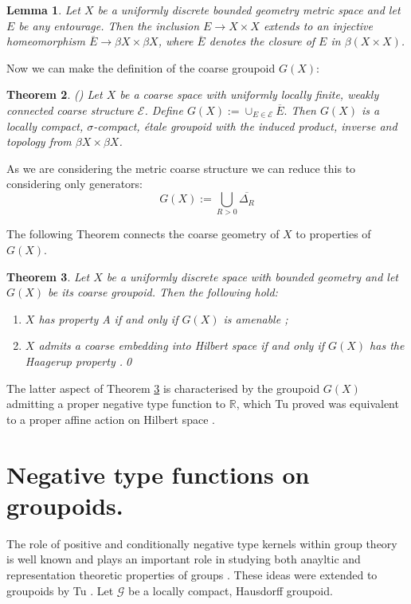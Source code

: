 \documentclass[11pt]{amsart}
\theoremstyle{plain}
\newtheorem{theorem}{Theorem}%
\newtheorem{lemma}[theorem]{Lemma}%
\theoremstyle{definition}%
\theoremstyle{remark}%
\newcommand{\G}{\mathcal{G}}
\begin{document}
\begin{lemma}\label{Lem:CorRoe} 
Let $X$ be a uniformly discrete bounded geometry metric space and let $E$ be any entourage. Then the inclusion $E \rightarrow X \times X$ extends to an injective homeomorphism $\overline{E} \rightarrow \beta X \times \beta X$, where $\overline{E}$ denotes the closure of $E$ in $\beta(X \times X)$.
\end{lemma}
Now we can make the definition of the coarse groupoid $G(X)$:
\begin{theorem}(\cite[Theorem 10.20]{MR2007488})
Let $X$ be a coarse space with uniformly locally finite, weakly connected coarse structure $\mathcal{E}$. Define $G(X):=\cup_{E\in \mathcal{E}}\overline{E}.$ Then $G(X)$ is a locally compact, $\sigma$-compact, \'etale groupoid with the induced product, inverse and topology from $\beta X \times \beta X$.
\end{theorem}
As we are considering the metric coarse structure we can reduce this to considering only generators:
\begin{equation*}
G(X):=\bigcup_{R>0}\overline{\Delta_{R}}
\end{equation*}

The following Theorem connects the coarse geometry of $X$ to properties of $G(X)$.

\begin{theorem}\label{thm:coarseprop}
Let $X$ be a uniformly discrete space with bounded geometry and let $G(X)$ be its coarse groupoid. Then the following hold:
\begin{enumerate}
\item $X$ has property A if and only if $G(X)$ is amenable \cite[Theorem 5.3]{MR1905840};
\item $X$ admits a coarse embedding into Hilbert space if and only if $G(X)$ has the Haagerup property \cite[Theorem 5.4]{MR1905840}.\qed
\end{enumerate}
\end{theorem}

The latter aspect of Theorem \ref{thm:coarseprop} is characterised by the groupoid $G(X)$ admitting a proper negative type function to $\mathbb{R}$, which Tu proved was equivalent to a proper affine action on Hilbert space \cite{MR1703305}.

\section{Negative type functions on groupoids.}\label{sect:negtype}
The role of positive and conditionally negative type kernels within group theory is well known and plays an important role in studying both anayltic and representation theoretic properties of groups \cite{MR2415834,MR1487204}. These ideas were extended to groupoids by Tu \cite{MR1703305}. Let $\G$ be a locally compact, Hausdorff groupoid.
\end{document}
